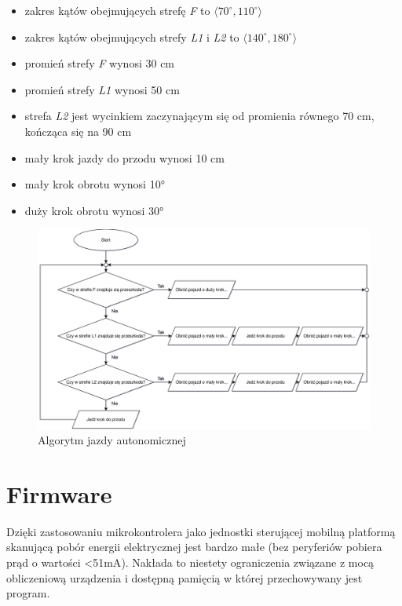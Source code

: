 \begin{itemize}
    \item zakres kątów obejmujących strefę \emph{F} to $\langle70^{\circ}, 110^{\circ}\rangle$
    \item zakres kątów obejmujących strefy \emph{L1} i \emph{L2} to $\langle140^{\circ}, 180^{\circ}\rangle$
    \item promień strefy \emph{F} wynosi 30 cm
    \item promień strefy \emph{L1} wynosi 50 cm
    \item strefa \emph{L2} jest wycinkiem zaczynającym się od promienia równego 70 cm, kończąca się na 90 cm
    \item mały krok jazdy do przodu wynosi 10 cm
    \item mały krok obrotu wynosi 10°
    \item duży krok obrotu wynosi 30°
\end{itemize}

\begin{figure}[ht]
	\centering
		\includegraphics[width=1\linewidth]{rys/autodrive-algorithm.pdf}
	\caption{Algorytm jazdy autonomicznej}
	\label{fig:autodrive-algorithm}
\end{figure}

\section{Firmware}
\label{sec:firmware}
Dzięki zastosowaniu mikrokontrolera jako jednostki sterującej mobilną platformą skanującą pobór energii elektrycznej jest bardzo małe (bez peryferiów pobiera prąd o wartości <51mA\cite{stm32-datasheet}). Nakłada to niestety ograniczenia związane z mocą obliczeniową urządzenia i dostępną pamięcią w której przechowywany jest program. 

